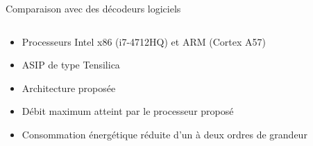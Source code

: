 \begin{frame}[c]{Comparaison avec des décodeurs logiciels}
  \begin{columns}[T] %
  \begin{column}{.48\textwidth}
    \begin{itemize}
      \vfill
      \item<+-> Processeurs Intel x86 (i7-4712HQ) et ARM (Cortex A57)
      \vfill
      \item<+-> ASIP de type Tensilica
      \vfill
      \item<+-> Architecture proposée
      \vfill
      \item<+-> Débit maximum atteint par le processeur proposé
      \vfill
      \item<+-> Consommation énergétique réduite d'un à deux ordres de grandeur
      \vfill
    \end{itemize}
  \end{column}

  \begin{column}{.48\textwidth}
\end{column}
\end{columns}
\end{frame}
